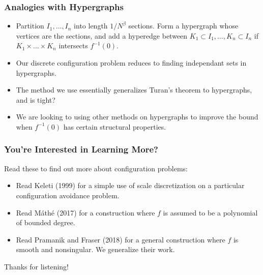 \documentclass{beamer}
\begin{document}
\begin{frame}
    \frametitle{Analogies with Hypergraphs}

    \begin{itemize}
        \item Partition $I_1, \dots, I_n$ into length $1/N^\beta$ sections. Form a hypergraph whose vertices are the sections, and add a hyperedge between $K_1 \subset I_1, \dots, K_n \subset I_n$ if $K_1 \times \dots \times K_n$ intersects $f^{-1}(0)$.
        \pause

        \item Our discrete configuration problem reduces to finding independant sets in hypergraphs.
        \pause

        \item The method we use essentially generalizes Turan's theorem to hypergraphs, and is tight?
        \pause

        \item We are looking to using other methods on hypergraphs to improve the bound when $f^{-1}(0)$ has certain structural properties.
    \end{itemize}
\end{frame}

\begin{frame}
    \frametitle{You're Interested in Learning More?}

Read these to find out more about configuration problems:

    \begin{itemize}
            \item Read Keleti (1999) for a simple use of scale discretization on a particular configuration avoidance problem.
            \pause
            \item Read M\'{a}th\'{e} (2017) for a construction where $f$ is assumed to be a polynomial of bounded degree.
            \pause
            \item Read Pramanik and Fraser (2018) for a general construction where $f$ is smooth and nonsingular. We generalize their work.
            \pause
    \end{itemize}

    Thanks for listening!
\end{frame}
\end{document}
